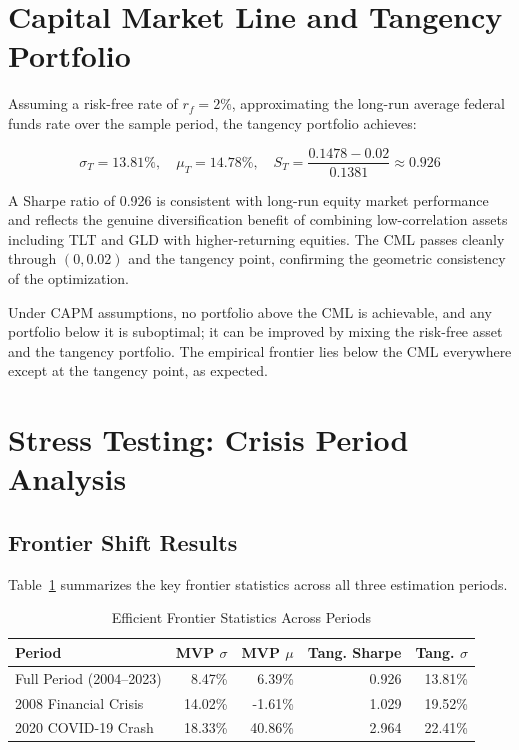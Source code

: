\documentclass[12pt]{article}
\begin{document}
\section{Capital Market Line and Tangency Portfolio}
\label{sec:cml}

Assuming a risk-free rate of $r_f = 2\%$, approximating the long-run average
federal funds rate over the sample period, the tangency portfolio achieves:

\begin{equation*}
  \sigma_T = 13.81\%, \quad \mu_T = 14.78\%, \quad
  S_T = \frac{0.1478 - 0.02}{0.1381} \approx 0.926
\end{equation*}

A Sharpe ratio of 0.926 is consistent with long-run equity market performance
and reflects the genuine diversification benefit of combining low-correlation
assets including TLT and GLD with higher-returning equities. The CML passes
cleanly through $(0, 0.02)$ and the tangency point, confirming the geometric
consistency of the optimization.

Under CAPM assumptions, no portfolio above the CML is achievable, and any
portfolio below it is suboptimal; it can be improved by mixing the risk-free
asset and the tangency portfolio. The empirical frontier lies below the CML
everywhere except at the tangency point, as expected.

\section{Stress Testing: Crisis Period Analysis}
\label{sec:stress}

\subsection{Frontier Shift Results}

Table~\ref{tab:stress} summarizes the key frontier statistics across all
three estimation periods.

\begin{table}[H]
  \centering
  \caption{Efficient Frontier Statistics Across Periods}
  \label{tab:stress}
  \begin{tabular}{lrrrr}
    \toprule
    Period & MVP $\sigma$ & MVP $\mu$ & Tang. Sharpe & Tang. $\sigma$ \\
    \midrule
    Full Period (2004--2023) &  8.47\% &  6.39\% & 0.926 & 13.81\% \\
    2008 Financial Crisis    & 14.02\% & -1.61\% & 1.029 & 19.52\% \\
    2020 COVID-19 Crash      & 18.33\% & 40.86\% & 2.964 & 22.41\% \\
    \bottomrule
  \end{tabular}
\end{table}
\end{document}
